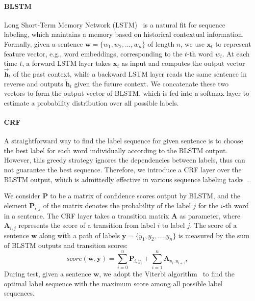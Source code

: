 \paragraph{BLSTM}
Long Short-Term Memory Network (LSTM)~\cite{hochreiter1997long} is a natural fit for sequence labeling, which maintains a memory based on historical contextual information. Formally, given a sentence $\bm{w} = \{w_1, w_2, \dots, w_n\}$ of length $n$, we use $\textbf{x}_t$ to represent feature vector, e.g., word embeddings, corresponding to the $t$-th word $w_t$.
At each time $t$, a forward LSTM layer takes $\textbf{x}_t$ as input and computes the output vector $\overrightarrow{\textbf{h}}_t$ of the past context, while a backward LSTM layer reads the same sentence in reverse and outputs $\overleftarrow{\textbf{h}}_t$ given the future context. We concatenate these two vectors to form the output vector of BLSTM, which is fed into a softmax layer to estimate a probability distribution over all possible labels.

\paragraph{CRF}
A straightforward way to find the label sequence for given sentence is to choose the
best label for each word individually according to the BLSTM output.
However, this greedy strategy ignores the dependencies between labels, thus can not guarantee the best sequence.  %
Therefore, we introduce a CRF layer over the BLSTM output, which is admittedly effective in various sequence labeling tasks~\cite{collobert2011natural,huang2015bidirectional}. %

We consider $\textbf{P}$ to be a matrix of confidence scores output by BLSTM, and the element $\textbf{P}_{i,j}$ of the matrix denotes the probability of the label $j$ for the $i$-th word in a sentence. The CRF layer takes a transition matrix $\textbf{A}$ as parameter, where $\textbf{A}_{i,j}$ represents the score of a transition from label $i$ to label $j$. The score of a sentence $\bm{w}$ along with a path of labels $\bm{y} = \{y_1, y_2, \ldots, y_n\}$ is measured by the sum of BLSTM outputs and transition scores:
\begin{equation}
	score(\bm{w}, \bm{y}) = \sum\limits_{i=0}^n\textbf{P}_{i, y_i} + \sum\limits_{i=1}^n\textbf{A}_{y_i, y_{i+1}},
\end{equation}
During test, given a sentence $\bm{w}$, we adopt the Viterbi algorithm~\cite{rabiner1989tutorial} to find the optimal label sequence with the maximum score among all possible label sequences.

